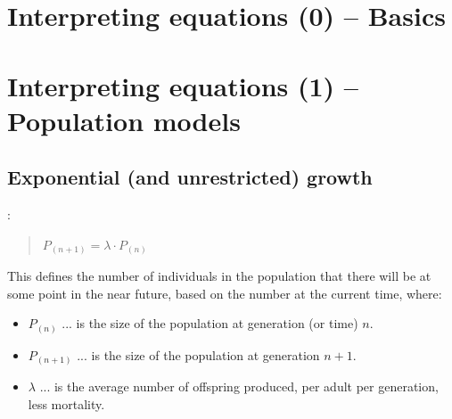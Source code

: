 \documentclass{tufte-book} %
\newenvironment{docspec}{\begin{quotation}\ttfamily\parskip0pt\parindent0pt\ignorespaces}{\end{quotation}}
\begin{document}

\newpage


\section{Interpreting equations (0) -- Basics}






\newpage


\section{Interpreting equations (1) -- Population models}


\subsection{Exponential (and unrestricted) growth}

\vspace{-2mm}
:

\begin{docspec}
\(P_{(n+1)} = \lambda\cdot P_{(n)}\)
\end{docspec}
This defines the number of individuals in the population that there will be at some point in the near  future, based on the number at the current time, where:

\begin{itemize}[noitemsep]
\setlength{\itemindent}{.2in}
\item \(P_{(n)}\) ... is the size of the population at generation (or time) \(n\).
\item \(P_{(n+1)}\) ... is the size of the population at generation \(n+1\).
\item \(\lambda\) ... is the average number of offspring produced, per adult per generation, less mortality.
\end{itemize}
\end{document}
